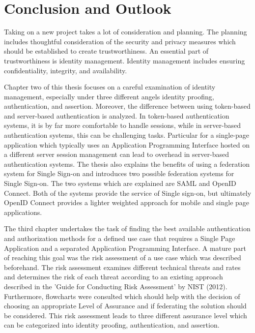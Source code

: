 \chapter{Conclusion and Outlook}\label{chap:conclusion}
\chapterstart

Taking on a new project takes a lot of consideration and planning. The planning includes thoughtful consideration of the security and privacy measures which should be established to create trustworthiness. An essential part of trustworthiness is identity management. Identity management includes ensuring confidentiality, integrity, and availability. 

Chapter two of this thesis focuses on a careful examination of identity management, especially under three different angels identity proofing, authentication, and assertion. Moreover, the difference between using token-based and server-based authentication is analyzed. In token-based authentication systems, it is by far more comfortable to handle sessions, while in server-based authentication systems, this can be challenging tasks. Particular for a single-page application which typically uses an Application Programming Interface hosted on a different server session management can lead to overhead in server-based authentication systems. The thesis also explains the benefits of using a federation system for Single Sign-on and introduces two possible federation systems for Single Sign-on. The two systems which are explained are SAML and OpenID Connect. Both of the systems provide the service of Single sign-on, but ultimately OpenID Connect provides a lighter weighted approach for mobile and single page applications.

The third chapter undertakes the task of finding the best available authentication and authorization methods for a defined use case that requires a Single Page Application and a separated Application Programming Interface. A mature part of reaching this goal was the risk assessment of a use case which was described beforehand. The risk assessment examines different technical threats and rates and determines the risk of each threat according to an existing approach described in the 'Guide for Conducting Risk Assessment' by NIST (2012). Furthermore, flowcharts were consulted which should help with the decision of choosing an appropriate Level of Assurance and if federating the solution should be considered. This risk assessment leads to three different assurance level which can be categorized into identity proofing, authentication, and assertion. 

